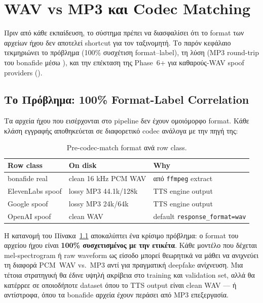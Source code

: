 \chapter{WAV vs MP3 και Codec Matching}
\label{chap:codec-wav-mp3}

Πριν από κάθε εκπαίδευση, το σύστημα πρέπει να διασφαλίσει ότι
το format των αρχείων ήχου δεν αποτελεί shortcut για τον ταξινομητή.
Το παρόν κεφάλαιο τεκμηριώνει το πρόβλημα (100\% συσχέτιση format–label),
τη λύση (MP3 round-trip του bonafide μέσω ),
και την επέκταση της Phase~6+ για καθαρούς-WAV spoof providers ().

\section{Το Πρόβλημα: 100\% Format-Label Correlation}
\label{sec:format-label-correlation}

Τα αρχεία ήχου που εισέρχονται στο pipeline δεν έχουν ομοιόμορφο format.
Κάθε κλάση εγγραφής αποθηκεύεται σε διαφορετικό codec
ανάλογα με την πηγή της:

\begin{table}[ht]
  \centering
  \begin{tabular}{lll}
    \toprule
    Row class & On disk & Why \\
    \midrule
    bonafide real & clean 16 kHz PCM WAV & από \texttt{ffmpeg} extract \\
    ElevenLabs spoof & lossy MP3 44.1k/128k & TTS engine output \\
    Google spoof & lossy MP3 24k/64k & TTS engine output \\
    OpenAI spoof & clean WAV & default \texttt{response\_format=wav} \\
    \bottomrule
  \end{tabular}
  \caption{Pre-codec-match format ανά row class.}
  \label{tab:precodec}
\end{table}

Η κατανομή του Πίνακα~\ref{tab:precodec} αποκαλύπτει ένα κρίσιμο πρόβλημα:
ο format του αρχείου ήχου είναι \textbf{100\% συσχετισμένος με την ετικέτα}.
Κάθε μοντέλο που δέχεται mel-spectrogram ή raw waveform ως είσοδο
μπορεί θεωρητικά να μάθει να ανιχνεύει τη διαφορά PCM~WAV vs.\ MP3
αντί για πραγματική deepfake ανίχνευση.
Μια τέτοια στρατηγική θα έδινε υψηλή ακρίβεια στο training και validation set,
αλλά θα κατέρρεε σε οποιοδήποτε dataset όπου το TTS output
είναι clean WAV — ή αντίστροφα, όπου τα bonafide αρχεία
έχουν περάσει από MP3 επεξεργασία.

